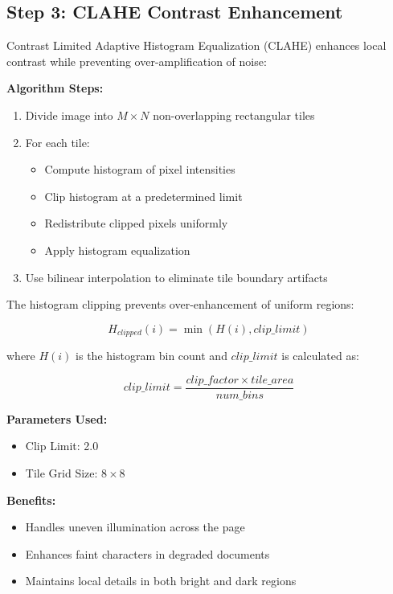\documentclass[12pt,a4paper,oneside]{report}
\begin{document}
\subsection{Step 3: CLAHE Contrast Enhancement}

Contrast Limited Adaptive Histogram Equalization (CLAHE) \cite{zuiderveld1994contrast} enhances local contrast while preventing over-amplification of noise:

\textbf{Algorithm Steps:}
\begin{enumerate}
    \item Divide image into $M \times N$ non-overlapping rectangular tiles
    \item For each tile:
    \begin{itemize}
        \item Compute histogram of pixel intensities
        \item Clip histogram at a predetermined limit
        \item Redistribute clipped pixels uniformly
        \item Apply histogram equalization
    \end{itemize}
    \item Use bilinear interpolation to eliminate tile boundary artifacts
\end{enumerate}

The histogram clipping prevents over-enhancement of uniform regions:

\begin{equation}
    H_{clipped}(i) = \min(H(i), clip\_limit)
\end{equation}

where $H(i)$ is the histogram bin count and $clip\_limit$ is calculated as:

\begin{equation}
    clip\_limit = \frac{clip\_factor \times tile\_area}{num\_bins}
\end{equation}

\textbf{Parameters Used:}
\begin{itemize}
    \item Clip Limit: 2.0
    \item Tile Grid Size: $8 \times 8$
\end{itemize}

\textbf{Benefits:}
\begin{itemize}
    \item Handles uneven illumination across the page
    \item Enhances faint characters in degraded documents
    \item Maintains local details in both bright and dark regions
\end{itemize}
\end{document}
